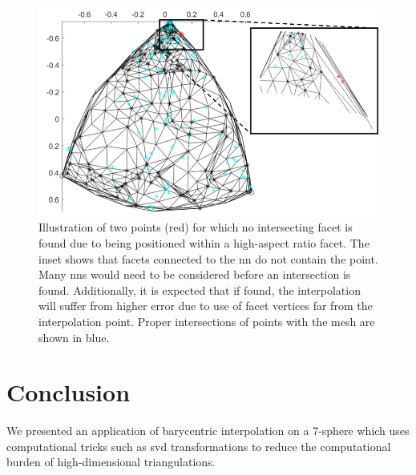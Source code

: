 \documentclass[final,12pt]{elsarticle}
\begin{document}
\begin{figure}
	\centering
	\includegraphics[scale=1]{figures/high-aspect-non-int.png}
	\caption{Illustration of two \outpt{} points (red) for which no intersecting facet is found due to being positioned within a high-aspect ratio facet. The inset shows that facets connected to the \gls{nn} do not contain the \outpt{} point. Many \glspl{nn} would need to be considered before an intersection is found. Additionally, it is expected that if found, the interpolation will suffer from higher error due to use of facet vertices far from the interpolation point. Proper intersections of \outpt{} points with the mesh are shown in blue.}
	\label{fig:high-aspect-non-int}
\end{figure}

\section{Conclusion}
We presented an application of barycentric interpolation on a 7-sphere which uses computational tricks such as \gls{svd} transformations to reduce the computational burden of high-dimensional triangulations.

\printglossaries



\end{document}
